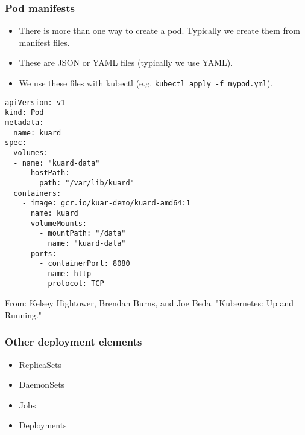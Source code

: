 \documentclass[10pt]{beamer}
\begin{document}
\begin{frame}
  \frametitle{Pod manifests}
  
  \begin{itemize}
    \item There is more than one way to create a pod. Typically we create them from manifest files.
    \item These are JSON or YAML files (typically we use YAML).
    \item We use these files with kubectl (e.g. \texttt{kubectl apply -f mypod.yml}).
  \end{itemize}
\end{frame}

\begin{frame}[fragile]

\begin{verbatim}
apiVersion: v1
kind: Pod
metadata:
  name: kuard
spec:
  volumes:
  - name: "kuard-data"
      hostPath:
        path: "/var/lib/kuard"
  containers:
    - image: gcr.io/kuar-demo/kuard-amd64:1
      name: kuard
      volumeMounts:
        - mountPath: "/data"
          name: "kuard-data"
      ports:
        - containerPort: 8080
          name: http
          protocol: TCP
\end{verbatim}

\tiny{From: Kelsey Hightower, Brendan Burns, and Joe Beda. "Kubernetes: Up and Running."}


\end{frame}

\begin{frame}
  \frametitle{Other deployment elements}
  
  \begin{itemize}
    \item ReplicaSets
    \item DaemonSets
    \item Jobs
    \item Deployments
  \end{itemize}
\end{frame}
\end{document}
